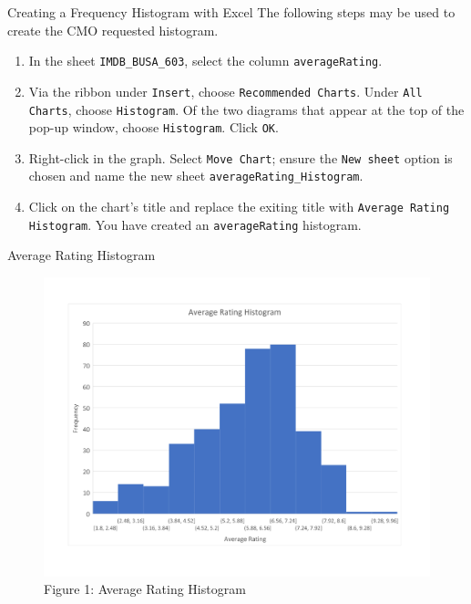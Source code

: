 \documentclass[pdf]{beamer}
\theoremstyle{remark}
\theoremstyle{definition}
\begin{document}
\begin{frame}[t]{Creating a Frequency Histogram with Excel}
The following steps may be used to create the CMO requested histogram. \\ 
\vspace{1.5ex}
\begin{enumerate}
\item In the sheet \texttt{IMDB\_BUSA\_603}, select the column \texttt{averageRating}.
\item Via the ribbon under \texttt{Insert}, choose \texttt{Recommended Charts}.  Under \texttt{All Charts}, choose \texttt{Histogram}.  Of the two diagrams that appear at the top of the pop-up window, choose \texttt{Histogram}. Click \texttt{OK}.  
\item Right-click in the graph. Select \texttt{Move Chart};  ensure the \texttt{New sheet} option is chosen and name the new sheet \texttt{averageRating\_Histogram}.
\item Click on the chart's title and replace the exiting title with \texttt{Average Rating Histogram}. You have created an \texttt{averageRating} histogram.
\end{enumerate}
\end{frame}

\begin{frame}{Average Rating Histogram}
\begin{figure}[htbp]
    \centering
    \captionsetup{justification=centering}
    \includegraphics[clip, trim=0cm 2cm 0cm 2cm, width=1\textwidth]{averageRating_Histogram.pdf}  
    \caption{Figure {\color{franklinblue} 1}: Average Rating Histogram}
    \label{fig:arhist}
\end{figure}
\end{frame}
\end{document}

